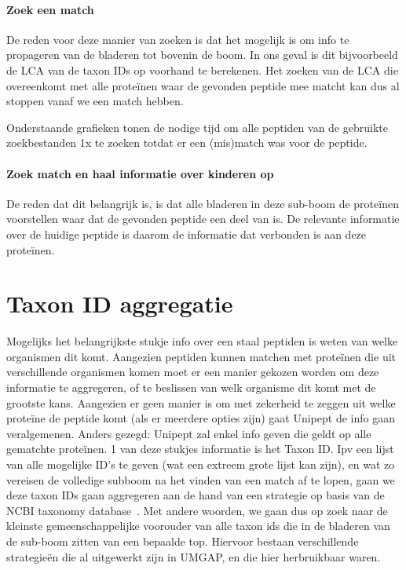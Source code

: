 \paragraph{Zoek een match}
De reden voor deze manier van zoeken is dat het mogelijk is om info te propageren van de bladeren tot bovenin de boom.
In ons geval is dit bijvoorbeeld de LCA van de taxon IDs op voorhand te berekenen.
Het zoeken van de LCA die overeenkomt met alle proteïnen waar de gevonden peptide mee matcht kan dus al stoppen vanaf we een match hebben.

Onderstaande grafieken tonen de nodige tijd om alle peptiden van de gebruikte zoekbestanden 1x te zoeken totdat er een (mis)match was voor de peptide.




\paragraph{Zoek match en haal informatie over kinderen op}
De reden dat dit belangrijk is, is dat alle bladeren in deze sub-boom de proteïnen voorstellen waar dat de gevonden peptide een deel van is.
De relevante informatie over de huidige peptide is daarom de informatie dat verbonden is aan deze proteïnen. %

\section{Taxon ID aggregatie}\label{sec:taxon-id-aggregatie}
Mogelijks het belangrijkste stukje info over een staal peptiden is weten van welke organismen dit komt.
Aangezien peptiden kunnen matchen met proteïnen die uit verschillende organismen komen moet er een manier gekozen worden om deze informatie te aggregeren, of te beslissen van welk organisme dit komt met de grootste kans.
Aangezien er geen manier is om met zekerheid te zeggen uit welke proteïne de peptide komt (als er meerdere opties zijn) gaat Unipept de info gaan veralgemenen.
Anders gezegd: Unipept zal enkel info geven die geldt op alle gematchte proteïnen.
1 van deze stukjes informatie is het Taxon ID\@.
Ipv een lijst van alle mogelijke ID's te geven (wat een extreem grote lijst kan zijn), en wat zo vereisen de volledige subboom na het vinden van een match af te lopen, gaan we deze taxon IDs gaan aggregeren aan de hand van een strategie op basis van de NCBI taxonomy database~\cite{NCBI_original_article, NCBI_update}.
Met andere woorden, we gaan dus op zoek naar de kleinste gemeenschappelijke voorouder van alle taxon ids die in de bladeren van de sub-boom zitten van een bepaalde top.
Hiervoor bestaan verschillende strategieën die al uitgewerkt zijn in UMGAP, en die hier herbruikbaar waren.

